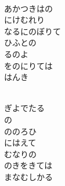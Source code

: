 \documentclass[10pt,b5j]{tarticle} %
\begin{document}
\begin{enumerate}
\begin{minipage}[c]{\blocksize}
        \vspace{\linespace}
        \item~\\
        あかつきはの\\
        にけむれり\\
        なるにのぼりて\\
        ひふとの\\
        るのよ\\
        をのにりては\\
        はんき
        
    \end{minipage}
    \begin{minipage}[c]{\blocksize}
        
        \vspace{\linespace}
        \item~\\
        ぎよでたる\\
        の\\
        ののろひ\\
        にはえて\\
        むなりの\\
        のきをきては\\
        まなむしかる
    
    \end{minipage}
\end{enumerate} %
\end{document}
